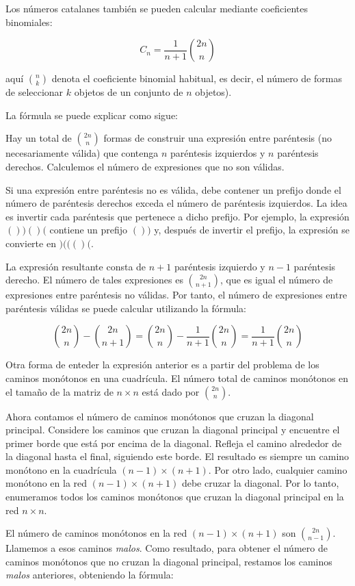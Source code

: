 Los números catalanes también se pueden calcular mediante coeficientes binomiales:

$$C_n = \frac{1}{n + 1} {\binom{2n}{n}}$$

aquí $\binom{n}{k}$ denota el coeficiente binomial habitual, es decir, el número de formas de seleccionar $k$ objetos de un conjunto de $n$ objetos).

La fórmula se puede explicar como sigue:

Hay un total de $\binom{2n}{n}$ formas de construir una expresión entre paréntesis (no necesariamente válida) que contenga $n$ paréntesis izquierdos y $n$ paréntesis derechos. Calculemos el número de expresiones que no son válidas.

Si una expresión entre paréntesis no es válida, debe contener un prefijo donde el número de paréntesis derechos exceda el número de paréntesis izquierdos. La idea es invertir cada paréntesis que pertenece a dicho prefijo. Por ejemplo, la expresión $())()($ contiene un prefijo $())$ y, después de invertir el prefijo, la expresión se convierte en $)((()($.

La expresión resultante consta de $n+1$ paréntesis izquierdo y $n-1$ paréntesis derecho. El número de tales expresiones es $\binom{2n}{n+1}$, que es igual el número de expresiones entre paréntesis no válidas. Por tanto, el número de expresiones entre paréntesis válidas se puede calcular utilizando la fórmula:

$$ \binom{2n}{n} - \binom{2n}{n+1} = \binom{2n}{n} - \frac{1}{n + 1} \binom{2n}{n} = \frac{1}{n + 1} \binom{2n}{n}   $$

Otra forma de enteder la expresión anterior es  a partir del problema de los caminos monótonos en 
una cuadrícula. El número total de caminos monótonos en el tamaño de la matriz de $n \times n$ está dado por $\binom{2n}{n}$.

Ahora contamos el número de caminos monótonos que cruzan la diagonal principal. Considere los 
caminos que cruzan la diagonal principal y encuentre el primer borde que está por encima de la 
diagonal. Refleja el camino alrededor de la diagonal hasta el final, siguiendo este borde. El 
resultado es siempre un camino monótono en la cuadrícula $(n - 1) \times (n + 1)$. Por otro 
lado, cualquier camino monótono en la red $(n - 1) \times (n + 1)$ debe cruzar la diagonal. Por 
lo tanto, enumeramos todos los caminos monótonos que cruzan la diagonal principal en la red $n 
\times n$.

El número de caminos monótonos en la red $(n-1) \times (n+1)$ son $\binom{2n}{n-1}$. Llamemos a esos caminos \emph{malos}. Como resultado, para obtener el número de caminos monótonos que no cruzan la diagonal principal, restamos los caminos \emph{malos} anteriores, obteniendo la fórmula:

